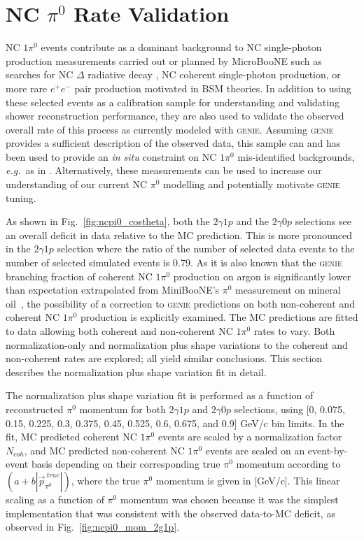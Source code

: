 \section{NC $\pi^0$ Rate Validation }
\label{sec:deficit}

NC $1\pi^0$ events contribute as a dominant background to NC single-photon production measurements carried out or planned by MicroBooNE such as searches for NC $\Delta$ radiative decay \cite{MicroBooNE:2021zai}, NC coherent single-photon production, or more rare $e^{+}e^{-}$ pair production motivated in BSM theories. In addition to using these selected events as a calibration sample for understanding and validating shower reconstruction performance, they are also used to validate the observed overall rate of this process as currently modeled with \textsc{genie}. Assuming \textsc{genie} provides a sufficient description of the observed data, this sample can and has been used to provide an \textit{in situ} constraint on NC $1\pi^0$ mis-identified backgrounds, \textit{e.g.}~as in \cite{MicroBooNE:2021zai}. Alternatively, these measurements can be used to increase our understanding of our current NC $\pi^0$ modelling and potentially motivate \textsc{genie} tuning.

As shown in Fig.~\ref{fig:ncpi0_costheta}, both the $2\gamma1p$ and the $2\gamma0p$ selections see an overall deficit in data relative to the MC prediction. This is more pronounced in the $2\gamma1p$ selection where the ratio of the number of selected data events to the number of selected simulated events is 0.79. As it is also known that the \textsc{genie} branching fraction of coherent NC $1\pi^{0}$ production on argon is significantly lower than expectation extrapolated from MiniBooNE's $\pi^{0}$ measurement on mineral oil~\cite{MiniBooNE:2008mmr}, the possibility of a correction to \textsc{genie} predictions on both non-coherent and coherent NC $1\pi^0$ production is explicitly examined. The MC predictions are fitted to data allowing both coherent and non-coherent NC $1\pi^{0}$ rates to vary. Both normalization-only and normalization plus shape variations to the coherent and non-coherent rates are explored; all yield similar conclusions. This section describes the normalization plus shape variation fit in detail.  

The normalization plus shape variation fit is performed as a function of reconstructed $\pi^0$ momentum for both 2$\gamma1p$ and $2\gamma0p$ selections, using [0, 0.075, 0.15, 0.225, 0.3, 0.375, 0.45, 0.525, 0.6, 0.675, and 0.9] GeV/c bin limits. In the fit, MC predicted coherent NC $1\pi^0$ events are scaled by a normalization factor $N_{coh}$, and MC predicted non-coherent NC $1\pi^0$ events are scaled on an event-by-event basis depending on their corresponding true $\pi^0$ momentum according to $(a+b|\vec{p}^{~true}_{\pi^{0}}|)$, where the true $\pi^0$ momentum is given in [GeV/c]. This linear scaling as a function of $\pi^0$ momentum was chosen because it was the simplest implementation that was consistent with the observed data-to-MC deficit, as observed in Fig.~\ref{fig:ncpi0_mom_2g1p}.

